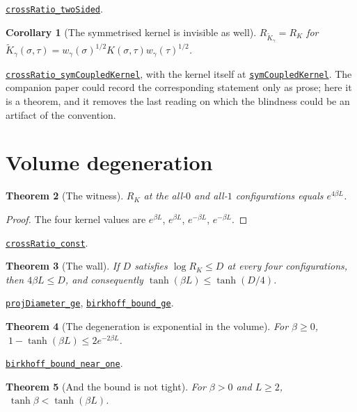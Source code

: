 \documentclass[11pt]{article}
\newtheorem{theorem}{Theorem}[section]
\newtheorem{corollary}[theorem]{Corollary}
\theoremstyle{definition}
\newcommand{\anchor}{a70426f4c8a0ed733b4eee94fb01b158bc81fd08}
\newcommand{\osline}[3]{%
  \href{https://github.com/lluiseriksson/THE-ERIKSSON-PROGRAMME/blob/\anchor/YangMills/OS/#1.lean\#L#2}{\nolinkurl{#3}}}
\begin{document}
\osline{SpatialBirkhoff}{258}{crossRatio\_twoSided}.

\begin{corollary}[The symmetrised kernel is invisible as well]\label{cor:sym}
$R_{\widetilde K_\gamma} = R_K$ for
$\widetilde K_\gamma(\sigma,\tau)=w_\gamma(\sigma)^{1/2}K(\sigma,\tau)
w_\gamma(\tau)^{1/2}$.
\end{corollary}

\osline{SpatialBirkhoff}{280}{crossRatio\_symCoupledKernel}, with the kernel
itself at \osline{SpatialBirkhoff}{273}{symCoupledKernel}.  The companion paper
could record the corresponding statement only as prose; here it is a theorem,
and it removes the last reading on which the blindness could be an artifact of
the convention.

\section{Volume degeneration}

\begin{theorem}[The witness]\label{thm:witness}
$R_K$ at the all-$0$ and all-$1$ configurations equals $e^{4\beta L}$.
\end{theorem}

\begin{proof}
The four kernel values are $e^{\beta L}$, $e^{\beta L}$, $e^{-\beta L}$,
$e^{-\beta L}$.
\end{proof}

\osline{SpatialBirkhoff}{192}{crossRatio\_const}.

\begin{theorem}[The wall]\label{thm:wall}
If $D$ satisfies $\log R_K \le D$ at every four configurations, then
$4\beta L\le D$, and consequently $\tanh(\beta L)\le\tanh(D/4)$.
\end{theorem}

\osline{SpatialBirkhoff}{207}{projDiameter\_ge},
\osline{SpatialBirkhoff}{216}{birkhoff\_bound\_ge}.

\begin{theorem}[The degeneration is exponential in the volume]\label{thm:degen}
For $\beta\ge0$, $\;1-\tanh(\beta L)\le 2e^{-2\beta L}$.
\end{theorem}

\osline{SpatialBirkhoff}{228}{birkhoff\_bound\_near\_one}.

\begin{theorem}[And the bound is not tight]\label{thm:nottight}
For $\beta>0$ and $L\ge2$, $\;\tanh\beta<\tanh(\beta L)$.
\end{theorem}
\end{document}
